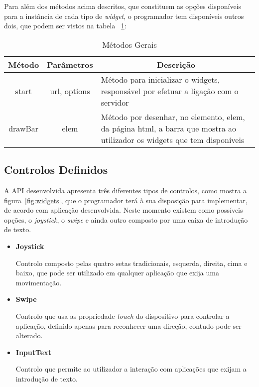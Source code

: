 Para além dos métodos acima descritos, que constituem as opções disponíveis para a instância de cada tipo de \textit{widget}, o programador tem disponíveis outros dois, que podem ser vistos na tabela ~\ref{table:metodos_g}:

	\begin{table}[ht]
 	\renewcommand{\arraystretch}{1.5}
	\centering

	\begin{tabular}{ p{2cm}|p{2cm}|p{10cm}  }
	\multicolumn{1}{c}{\textbf{Método}} & \multicolumn{1}{c}{\textbf{Parâmetros}} & \multicolumn{1}{c}{\textbf{Descrição}} \\
	\hline
	\multicolumn{1}{c}{start} & \multicolumn{1}{c}{url, options} &Método para inicializar o widgets, responsável por efetuar a ligação com o servidor \\
	\hline
	\multicolumn{1}{c}{drawBar} & \multicolumn{1}{c}{elem} &Método por desenhar, no elemento, elem, da página html, a barra que mostra ao utilizador os widgets que tem disponíveis \\
	\hline
	\end{tabular}
	\caption{Métodos Gerais}
	\label{table:metodos_g}
	\end{table}


\subsection{Controlos Definidos}

	A API desenvolvida apresenta três diferentes tipos de controlos, como mostra a figura~\ref{fig:widgets}, que o programador terá à sua disposição para implementar, de acordo com aplicação desenvolvida. Neste momento existem como possíveis opções, o \textit{joystick}, o \textit{swipe} e ainda outro composto por uma caixa de introdução de texto.

	\begin{itemize}

	\item \textbf{Joystick}

		Controlo composto pelas quatro setas tradicionais, esquerda, direita, cima e baixo, que pode ser utilizado em qualquer aplicação que exija uma movimentação.

	\item \textbf{Swipe}

		Controlo que usa as propriedade \textit{touch} do dispositivo para controlar a aplicação, definido apenas para reconhecer uma direção, contudo pode ser alterado.

	\item \textbf{InputText}

		Controlo que permite ao utilizador a interação com aplicações que exijam a introdução de texto.

	\end{itemize}

